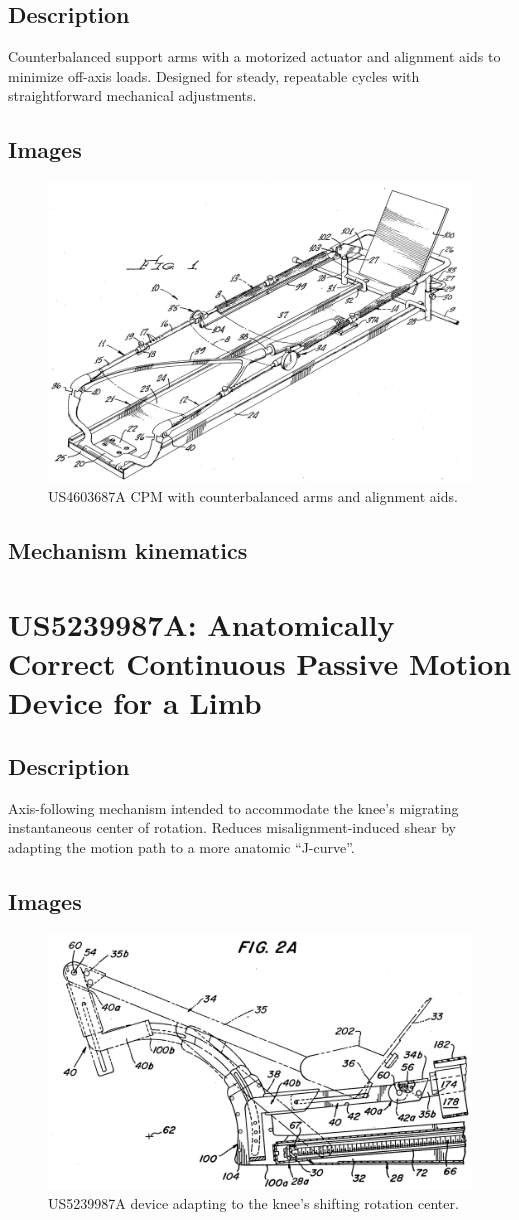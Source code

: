 \documentclass[11pt]{article}
\begin{document}
\subsection{Description}
Counterbalanced support arms with a motorized actuator and alignment aids to minimize off-axis loads. Designed for steady, repeatable cycles with straightforward mechanical adjustments.
\subsection{Images}
\begin{figure}[H]
  \centering
  \includegraphics[width=0.54\linewidth]{US4603687_1.png}
  \caption{US4603687A CPM with counterbalanced arms and alignment aids.}
  \label{fig:US4603687A}
\end{figure}

\subsection{Mechanism kinematics}

\section{US5239987A: Anatomically Correct Continuous Passive Motion Device for a Limb}
\subsection{Description}
Axis-following mechanism intended to accommodate the knee’s migrating instantaneous center of rotation. Reduces misalignment-induced shear by adapting the motion path to a more anatomic \enquote{J-curve}.
\subsection{Images}
\begin{figure}[H]
  \centering
  \includegraphics[width=0.54\linewidth]{US5239987-drawings-page-3.png}
  \caption{US5239987A device adapting to the knee’s shifting rotation center.}
  \label{fig:US5239987A}
\end{figure}
\end{document}
